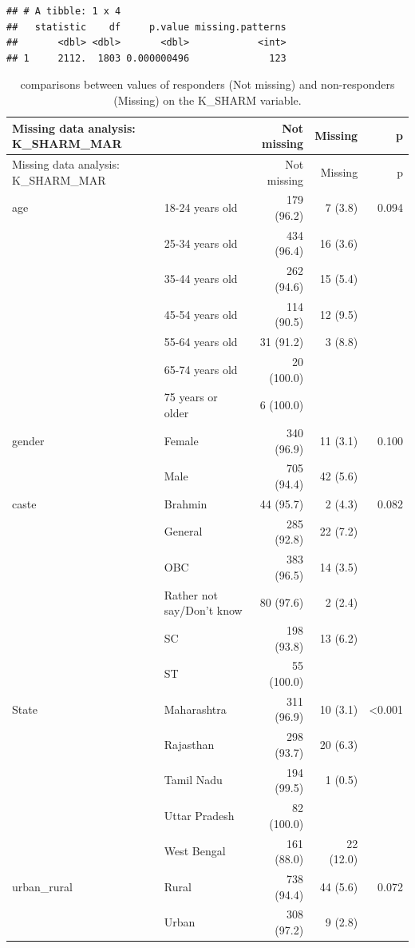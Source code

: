 \documentclass[
]{article}
\begin{document}
\begin{verbatim}
## # A tibble: 1 x 4
##   statistic    df     p.value missing.patterns
##       <dbl> <dbl>       <dbl>            <int>
## 1     2112.  1803 0.000000496              123
\end{verbatim}

\begin{longtable}[]{@{}llrrr@{}}
\caption{comparisons between values of responders (Not missing) and
non-responders (Missing) on the K\_SHARM variable.}\tabularnewline
\toprule
Missing data analysis: K\_SHARM\_MAR & & Not missing & Missing & p \\
\midrule
\endfirsthead
\toprule
Missing data analysis: K\_SHARM\_MAR & & Not missing & Missing & p \\
\midrule
\endhead
age & 18-24 years old & 179 (96.2) & 7 (3.8) & 0.094 \\
& 25-34 years old & 434 (96.4) & 16 (3.6) & \\
& 35-44 years old & 262 (94.6) & 15 (5.4) & \\
& 45-54 years old & 114 (90.5) & 12 (9.5) & \\
& 55-64 years old & 31 (91.2) & 3 (8.8) & \\
& 65-74 years old & 20 (100.0) & & \\
& 75 years or older & 6 (100.0) & & \\
gender & Female & 340 (96.9) & 11 (3.1) & 0.100 \\
& Male & 705 (94.4) & 42 (5.6) & \\
caste & Brahmin & 44 (95.7) & 2 (4.3) & 0.082 \\
& General & 285 (92.8) & 22 (7.2) & \\
& OBC & 383 (96.5) & 14 (3.5) & \\
& Rather not say/Don't know & 80 (97.6) & 2 (2.4) & \\
& SC & 198 (93.8) & 13 (6.2) & \\
& ST & 55 (100.0) & & \\
State & Maharashtra & 311 (96.9) & 10 (3.1) & \textless0.001 \\
& Rajasthan & 298 (93.7) & 20 (6.3) & \\
& Tamil Nadu & 194 (99.5) & 1 (0.5) & \\
& Uttar Pradesh & 82 (100.0) & & \\
& West Bengal & 161 (88.0) & 22 (12.0) & \\
urban\_rural & Rural & 738 (94.4) & 44 (5.6) & 0.072 \\
& Urban & 308 (97.2) & 9 (2.8) & \\

\end{longtable}
\end{document}
